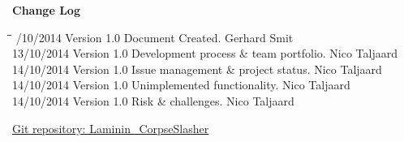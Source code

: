\documentclass[letterpaper]{article}
\begin{document}
\begin{titlepage}
\begin{center}
\end{center}
\vfill %

\end{titlepage}
	\newpage
	{\LARGE \bf Change Log}\\[2em]
	
	\begin{tabbing}
		\hspace*{2.5cm}\=\hspace*{2.5cm}\=\hspace*{8cm}\=\hspace*{3cm} /10/2014	\> Version 1.0	\> Document Created.							\> Gerhard Smit \\
		13/10/2014	\> Version 1.0	\> Development process \& team portfolio. 		\> Nico Taljaard \\
		14/10/2014	\> Version 1.0	\> Issue management \& project status.			\> Nico Taljaard \\
		14/10/2014	\> Version 1.0	\> Unimplemented functionality.					\> Nico Taljaard \\
		14/10/2014	\> Version 1.0	\> Risk \& challenges. 							\> Nico Taljaard \\
		
		
	\end{tabbing}
	
		\newpage
		\renewcommand\contentsname{TABLE OF CONTENTS}
		\newcommand\contentsnameLC{\colorbox{black}{\makebox[\textwidth-2\fboxsep][l]{\bfseries\color{red} Table of Contents}}}
		
		\renewcommand{\cftdot}{}
		\hypersetup{linktocpage}
		\tableofcontents
		
		\begin{flushleft}
			\LARGE\href{https://github.com/njTaljaard/Laminin_CorpseSlasher/}{Git repository: Laminin\_CorpseSlasher}
		\end{flushleft}
		
	\newpage
	\section*{\colorbox{black}{}} 
		\vspace{0.1in}
		
\end{document}
